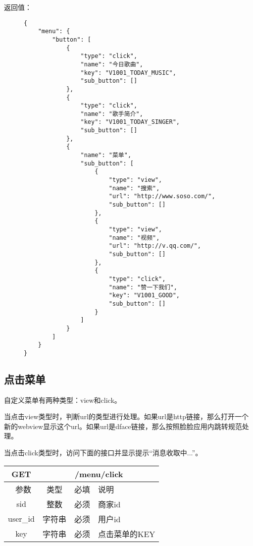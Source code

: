 \documentclass[cs4size]{ctexartutf8}
\begin{document}
返回值：
\begin{figure}[H]
\begin{verbatim}
{
    "menu": {
        "button": [
            {
                "type": "click",
                "name": "今日歌曲",
                "key": "V1001_TODAY_MUSIC",
                "sub_button": []
            },
            {
                "type": "click",
                "name": "歌手简介",
                "key": "V1001_TODAY_SINGER",
                "sub_button": []
            },
            {
                "name": "菜单",
                "sub_button": [
                    {
                        "type": "view",
                        "name": "搜索",
                        "url": "http://www.soso.com/",
                        "sub_button": []
                    },
                    {
                        "type": "view",
                        "name": "视频",
                        "url": "http://v.qq.com/",
                        "sub_button": []
                    },
                    {
                        "type": "click",
                        "name": "赞一下我们",
                        "key": "V1001_GOOD",
                        "sub_button": []
                    }
                ]
            }
        ]
    }
}
\end{verbatim}
\end{figure}


\subsection{点击菜单}
自定义菜单有两种类型：view和click。

当点击view类型时，判断url的类型进行处理。如果url是http链接，那么打开一个新的webview显示这个url。如果url是dface链接，那么按照脸脸应用内跳转规范处理。

当点击click类型时，访问下面的接口并显示提示“消息收取中...”。

\begin{table}[H]
   \begin{center}
\begin{tabular}{|c|c|c|p{12cm}|}
\hline
GET & \multicolumn{3}{|c|}{/menu/click} \\
\hline\hline
 \  参数  & 类型 & 必填 &  说明  \\
   \hline
 sid  & 整数 & 必须 & 商家id\\ 
  \hline
 user\_id  & 字符串 & 必须 & 用户id\\ 
  \hline
 key  & 字符串 & 必须 & 点击菜单的KEY\\ 
  \hline
\end{tabular}
   \end{center}
\end{table}
\end{document}
